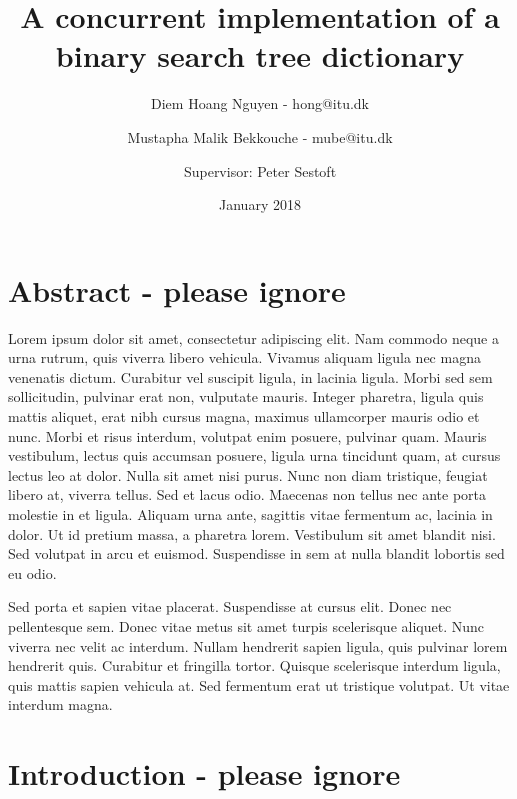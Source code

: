 \documentclass{article}
\title{A concurrent implementation of a binary search tree dictionary}
\author{Diem Hoang Nguyen - hong@itu.dk  \and Mustapha Malik Bekkouche - mube@itu.dk \and Supervisor: Peter Sestoft}
\date{January 2018}
\begin{document}
\maketitle

\section{Abstract - please ignore}

 Lorem ipsum dolor sit amet, consectetur adipiscing elit. Nam commodo neque a urna rutrum, quis viverra libero vehicula. Vivamus aliquam ligula nec magna venenatis dictum. Curabitur vel suscipit ligula, in lacinia ligula. Morbi sed sem sollicitudin, pulvinar erat non, vulputate mauris. Integer pharetra, ligula quis mattis aliquet, erat nibh cursus magna, maximus ullamcorper mauris odio et nunc. Morbi et risus interdum, volutpat enim posuere, pulvinar quam. Mauris vestibulum, lectus quis accumsan posuere, ligula urna tincidunt quam, at cursus lectus leo at dolor. Nulla sit amet nisi purus. Nunc non diam tristique, feugiat libero at, viverra tellus. Sed et lacus odio. Maecenas non tellus nec ante porta molestie in et ligula. Aliquam urna ante, sagittis vitae fermentum ac, lacinia in dolor. Ut id pretium massa, a pharetra lorem. Vestibulum sit amet blandit nisi. Sed volutpat in arcu et euismod. Suspendisse in sem at nulla blandit lobortis sed eu odio.

Sed porta et sapien vitae placerat. Suspendisse at cursus elit. Donec nec pellentesque sem. Donec vitae metus sit amet turpis scelerisque aliquet. Nunc viverra nec velit ac interdum. Nullam hendrerit sapien ligula, quis pulvinar lorem hendrerit quis. Curabitur et fringilla tortor. Quisque scelerisque interdum ligula, quis mattis sapien vehicula at. Sed fermentum erat ut tristique volutpat. Ut vitae interdum magna. 


\newpage

\tableofcontents

\newpage

\section{Introduction - please ignore}
\end{document}
